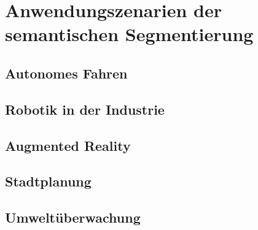 \chapter{Anwendungszenarien der semantischen Segmentierung}
\section{Autonomes Fahren}
\section{Robotik in der Industrie}
\section{Augmented Reality}
\section{Stadtplanung}
\section{Umweltüberwachung}



